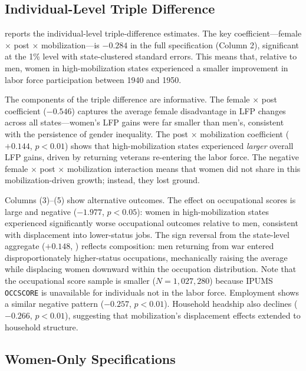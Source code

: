 \documentclass[12pt]{article}
\begin{document}
\subsection{Individual-Level Triple Difference}

 reports the individual-level triple-difference estimates. The key coefficient---female $\times$ post $\times$ mobilization---is $-0.284$ in the full specification (Column 2), significant at the 1\% level with state-clustered standard errors. This means that, relative to men, women in high-mobilization states experienced a smaller improvement in labor force participation between 1940 and 1950.

The components of the triple difference are informative. The female $\times$ post coefficient ($-0.546$) captures the average female disadvantage in LFP changes across all states---women's LFP gains were far smaller than men's, consistent with the persistence of gender inequality. The post $\times$ mobilization coefficient ($+0.144$, $p < 0.01$) shows that high-mobilization states experienced \textit{larger} overall LFP gains, driven by returning veterans re-entering the labor force. The negative female $\times$ post $\times$ mobilization interaction means that women did not share in this mobilization-driven growth; instead, they lost ground.

Columns (3)--(5) show alternative outcomes. The effect on occupational scores is large and negative ($-1.977$, $p < 0.05$): women in high-mobilization states experienced significantly worse occupational outcomes relative to men, consistent with displacement into lower-status jobs. The sign reversal from the state-level aggregate ($+0.148$, ) reflects composition: men returning from war entered disproportionately higher-status occupations, mechanically raising the average while displacing women downward within the occupation distribution. Note that the occupational score sample is smaller ($N = 1{,}027{,}280$) because IPUMS \texttt{OCCSCORE} is unavailable for individuals not in the labor force. Employment shows a similar negative pattern ($-0.257$, $p < 0.01$). Household headship also declines ($-0.266$, $p < 0.01$), suggesting that mobilization's displacement effects extended to household structure.



\subsection{Women-Only Specifications}
\end{document}
